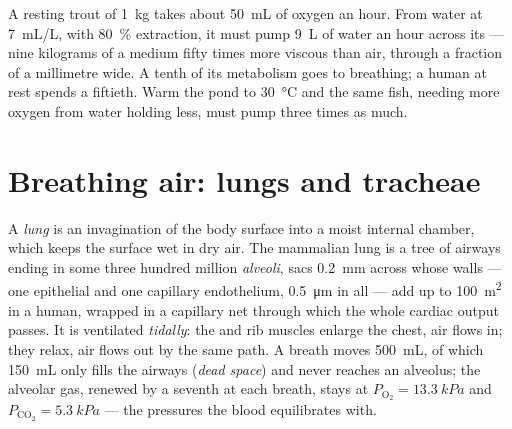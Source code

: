 \begin{example}\label{ex:b1:gas-exchange:priceofwater}
A resting trout of \qty{1}{kg} takes about \qty{50}{mL} of oxygen an
hour. From water at \qty{7}{mL/L}, with \qty{80}{\%} extraction, it must
pump \qty{9}{L} of water an hour across its  --- nine kilograms of
a medium fifty times more viscous than air, through  a fraction
of a millimetre wide. A tenth of its metabolism goes to breathing; a
human at rest spends a fiftieth. Warm the pond to \qty{30}{\celsius}
and the same fish, needing more oxygen from water holding less, must
pump three times as much.
\end{example}

\section{Breathing air: lungs and tracheae}

\begin{definition}\label{def:b1:gas-exchange:lung}
A \emph{lung} is an invagination of the body surface into a moist
internal chamber, which keeps the surface wet in dry air. The
mammalian lung is a tree of airways ending in some three hundred
million \emph{alveoli}, sacs \qty{0.2}{mm} across whose walls --- one
epithelial  and one capillary endothelium, \qty{0.5}{\micro m} in
all --- add up to \qty{100}{m^2} in a human, wrapped in a capillary
net through which the whole cardiac output passes. It is ventilated
\emph{tidally}: the  and rib muscles enlarge the chest, air
flows in; they relax, air flows out by the same path. A breath moves
\qty{500}{mL}, of which \qty{150}{mL} only fills the airways
(\emph{dead space}) and never reaches an alveolus; the alveolar gas,
renewed by a seventh at each breath, stays at $P_{\mathrm{O_2}} =
\qty{13.3}{kPa}$ and $P_{\mathrm{CO_2}} = \qty{5.3}{kPa}$ --- the
pressures the blood equilibrates with.
\end{definition}

